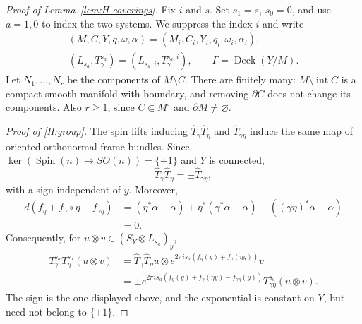 \documentclass[12pt,reqno]{amsart}
\numberwithin{equation}{section}
\theoremstyle{definition}
\newcommand{\Deck}{\operatorname{Deck}}
\begin{document}
\begin{proof}[Proof of Lemma~\ref{lem:H-coverings}]
Fix $i$ and $s$. Set $s_1=s$, $s_0=0$, and use $a=1,0$ to index
the two systems. We suppress the index $i$ and write
\[
 \begin{gathered}
 (M,C,Y,q,\omega,\alpha)=(M_i,C_i,Y_i,q_i,\omega_i,\alpha_i),\\
 (L_{s_a},T^{s_a}_\gamma)=(L_{s_a,i},T^{s_a,i}_\gamma),
 \qquad \Gamma=\Deck(Y/M).
 \end{gathered}
\]
Let $N_1,\ldots,N_r$ be the components of $M\setminus C$.
There are finitely many: $M\setminus\operatorname{int}C$ is a compact
smooth manifold with boundary, and removing $\partial C$ does not
change its components. Also $r\geq1$, since $C\Subset M^\circ$ and
$\partial M\ne\varnothing$.

\emph{Proof of \ref{H:group}.}
The spin lifts inducing
$\widehat T_\gamma\widehat T_\eta$ and
$\widehat T_{\gamma\eta}$ induce the same map of oriented
orthonormal-frame bundles.
Since $\ker(\operatorname{Spin}(n)\to SO(n))=\{\pm1\}$ and $Y$ is connected,
\[
 \widehat T_\gamma\widehat T_\eta=\pm\widehat T_{\gamma\eta},
\]
with a sign independent of $y$. Moreover,
\[
\begin{aligned}
 d(f_\eta+f_\gamma\circ\eta-f_{\gamma\eta})
 &=(\eta^*\alpha-\alpha)+\eta^*(\gamma^*\alpha-\alpha)
   -((\gamma\eta)^*\alpha-\alpha)\\
 &=0.
\end{aligned}
\]
Consequently, for $u\otimes v\in(S_Y\otimes L_{s_a})_y$,
\begin{equation}\label{eq:appendix-tau}
\begin{aligned}
 T^{s_a}_\gamma T^{s_a}_\eta(u\otimes v)
 &=\widehat T_\gamma\widehat T_\eta u
   \otimes e^{2\pi i s_a(f_\eta(y)+f_\gamma(\eta y))}v\\
 &=\pm e^{2\pi i s_a(f_\eta(y)+f_\gamma(\eta y)-f_{\gamma\eta}(y))}
   T^{s_a}_{\gamma\eta}(u\otimes v).
\end{aligned}
\end{equation}
The sign is the one displayed above, and the exponential is constant
on $Y$, but need not belong to $\{\pm1\}$.


\end{proof}
\end{document}
